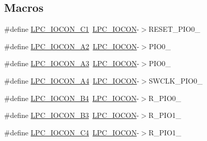 \subsection*{Macros}
\begin{DoxyCompactItemize}
\item 
\#define \hyperlink{group___l_p_c___i_o_c_o_n___l_p_c1102___a_s_o_c_i_a_c_i_o_n_e_s_gadf840fda55b54a90ad1ae46d4f2abe29}{L\+P\+C\+\_\+\+I\+O\+C\+O\+N\+\_\+\+C1}~\hyperlink{group___l_p_c11xx___definitions_gaabc651799ba17b0dd4a0114c8d48a145}{L\+P\+C\+\_\+\+I\+O\+C\+ON}-\/$>$R\+E\+S\+E\+T\+\_\+\+P\+I\+O0\+\_
\item 
\#define \hyperlink{group___l_p_c___i_o_c_o_n___l_p_c1102___a_s_o_c_i_a_c_i_o_n_e_s_gad07b47c89c86b1b5688e116e09357df6}{L\+P\+C\+\_\+\+I\+O\+C\+O\+N\+\_\+\+A2}~\hyperlink{group___l_p_c11xx___definitions_gaabc651799ba17b0dd4a0114c8d48a145}{L\+P\+C\+\_\+\+I\+O\+C\+ON}-\/$>$P\+I\+O0\+\_
\item 
\#define \hyperlink{group___l_p_c___i_o_c_o_n___l_p_c1102___a_s_o_c_i_a_c_i_o_n_e_s_ga30b8aa33fff57304e533c0a5f5a80d9a}{L\+P\+C\+\_\+\+I\+O\+C\+O\+N\+\_\+\+A3}~\hyperlink{group___l_p_c11xx___definitions_gaabc651799ba17b0dd4a0114c8d48a145}{L\+P\+C\+\_\+\+I\+O\+C\+ON}-\/$>$P\+I\+O0\+\_
\item 
\#define \hyperlink{group___l_p_c___i_o_c_o_n___l_p_c1102___a_s_o_c_i_a_c_i_o_n_e_s_ga58fdb2acc1fb471de0c2e6579996c501}{L\+P\+C\+\_\+\+I\+O\+C\+O\+N\+\_\+\+A4}~\hyperlink{group___l_p_c11xx___definitions_gaabc651799ba17b0dd4a0114c8d48a145}{L\+P\+C\+\_\+\+I\+O\+C\+ON}-\/$>$S\+W\+C\+L\+K\+\_\+\+P\+I\+O0\+\_
\item 
\#define \hyperlink{group___l_p_c___i_o_c_o_n___l_p_c1102___a_s_o_c_i_a_c_i_o_n_e_s_ga4a57e0dbac00d893c3aba917a8295e2d}{L\+P\+C\+\_\+\+I\+O\+C\+O\+N\+\_\+\+B4}~\hyperlink{group___l_p_c11xx___definitions_gaabc651799ba17b0dd4a0114c8d48a145}{L\+P\+C\+\_\+\+I\+O\+C\+ON}-\/$>$R\+\_\+\+P\+I\+O0\+\_
\item 
\#define \hyperlink{group___l_p_c___i_o_c_o_n___l_p_c1102___a_s_o_c_i_a_c_i_o_n_e_s_gaabdb13248922a7b2c88b212a48d943b9}{L\+P\+C\+\_\+\+I\+O\+C\+O\+N\+\_\+\+B3}~\hyperlink{group___l_p_c11xx___definitions_gaabc651799ba17b0dd4a0114c8d48a145}{L\+P\+C\+\_\+\+I\+O\+C\+ON}-\/$>$R\+\_\+\+P\+I\+O1\+\_
\item 
\#define \hyperlink{group___l_p_c___i_o_c_o_n___l_p_c1102___a_s_o_c_i_a_c_i_o_n_e_s_ga434a8f458a9a2656343d24444391f2c8}{L\+P\+C\+\_\+\+I\+O\+C\+O\+N\+\_\+\+C4}~\hyperlink{group___l_p_c11xx___definitions_gaabc651799ba17b0dd4a0114c8d48a145}{L\+P\+C\+\_\+\+I\+O\+C\+ON}-\/$>$R\+\_\+\+P\+I\+O1\+\_

\end{DoxyCompactItemize}
